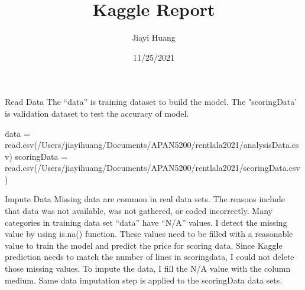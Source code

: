 \documentclass[
]{article}
\title{Kaggle Report}
\author{Jiayi Huang}
\date{11/25/2021}
\newenvironment{Shaded}{\begin{snugshade}}{\end{snugshade}}
\newcommand{\FunctionTok}[1]{\textcolor[rgb]{0.00,0.00,0.00}{#1}}
\newcommand{\NormalTok}[1]{#1}
\newcommand{\OtherTok}[1]{\textcolor[rgb]{0.56,0.35,0.01}{#1}}
\newcommand{\StringTok}[1]{\textcolor[rgb]{0.31,0.60,0.02}{#1}}
\begin{document}
\maketitle

Read Data The ``data'' is training dataset to build the model. The
"scoringData' is validation dataset to test the accuracy of model.

\begin{Shaded}
\begin{Highlighting}[]
\NormalTok{data }\OtherTok{=} \FunctionTok{read.csv}\NormalTok{(}\StringTok{\textquotesingle{}/Users/jiayihuang/Documents/APAN5200/rentlala2021/analysisData.csv\textquotesingle{}}\NormalTok{)}
\NormalTok{scoringData }\OtherTok{=} \FunctionTok{read.csv}\NormalTok{(}\StringTok{\textquotesingle{}/Users/jiayihuang/Documents/APAN5200/rentlala2021/scoringData.csv\textquotesingle{}}\NormalTok{)}
\end{Highlighting}
\end{Shaded}

Impute Data Missing data are common in real data sets. The reasons
include that data was not available, was not gathered, or coded
incorrectly. Many categories in training data set ``data'' have ``N/A''
values. I detect the missing value by using is.na() function. These
values need to be filled with a reasonable value to train the model and
predict the price for scoring data. Since Kaggle prediction needs to
match the number of lines in scoringdata, I could not delete those
missing values. To impute the data, I fill the N/A value with the column
medium. Same data imputation step is applied to the scoringData data
sets.
\end{document}
